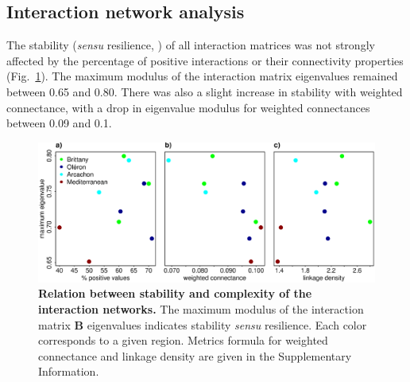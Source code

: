 \documentclass[10pt]{article}
\begin{document}
\subsection*{Interaction network analysis}

The stability (\emph{sensu} resilience, \citealt{ives_stability_2007})
of all interaction matrices was not strongly affected by the percentage
of positive interactions or their connectivity properties (Fig.~\ref{fig:Stability-community}).
The maximum modulus of the interaction matrix eigenvalues remained
between 0.65 and 0.80. There was also a slight increase in stability
with weighted connectance, with a drop in eigenvalue modulus for weighted
connectances between 0.09 and 0.1.

\begin{figure}[!ht]
\centering \includegraphics[width=1\textwidth]{complexity_stability_MainFig_pencenjustB}
\caption{\textbf{Relation between stability and complexity of the interaction
networks.} The maximum modulus of the interaction matrix $\mathbf{B}$
eigenvalues indicates stability \emph{sensu} resilience. Each color corresponds to a given region. Metrics formula for weighted
connectance and linkage density are given in the Supplementary Information.}
\label{fig:Stability-community} 
\end{figure}
\end{document}

